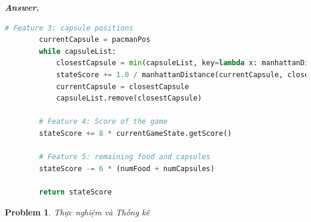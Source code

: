 \documentclass[12pt]{article}
\newtheorem{problem}{Problem}
\newenvironment{solution}[1][\it{Answer}]{\textbf{#1. } }{}
\begin{document}
\begin{solution}
\begin{tcolorbox}[boxrule=0.5pt, colback=white]
\begin{lstlisting}[language=python, numbers=none, basicstyle=\ttfamily\footnotesize]
        # Feature 3: capsule positions
        currentCapsule = pacmanPos
        while capsuleList:
            closestCapsule = min(capsuleList, key=lambda x: manhattanDistance(x, currentCapsule))
            stateScore += 1.0 / manhattanDistance(currentCapsule, closestCapsule)
            currentCapsule = closestCapsule
            capsuleList.remove(closestCapsule)
    
        # Feature 4: Score of the game
        stateScore += 8 * currentGameState.getScore()
    
        # Feature 5: remaining food and capsules
        stateScore -= 6 * (numFood + numCapsules)
    
        return stateScore
    \end{lstlisting}
    \end{tcolorbox}
\end{solution}


\begin{problem}
	Thực nghiệm và Thống kê
\end{problem}
\end{document}
